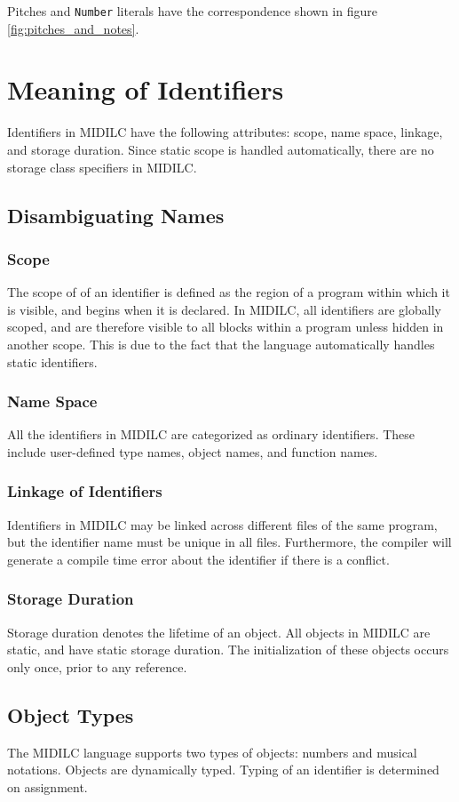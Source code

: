 \documentclass[12pt,A4]{book}
\begin{document}
Pitches and \verb|Number| literals have the correspondence shown in figure \ref{fig:pitches_and_notes}.

\section{Meaning of Identifiers}
Identifiers in MIDILC have the following attributes: scope, name space, linkage, and storage duration. Since static scope is handled automatically, there are no storage class specifiers in MIDILC.
\subsection{Disambiguating Names}
\subsubsection{Scope}
The scope of of an identifier is defined as the region of a program within which it is visible, and begins when it is declared. In MIDILC, all identifiers are globally scoped, and are therefore visible to all blocks within a program unless hidden in another scope. This is due to the fact that the language automatically handles static identifiers.
\subsubsection{Name Space}
All the identifiers in MIDILC are categorized as ordinary identifiers. These include user-defined type names, object names, and function names.
\subsubsection{Linkage of Identifiers}
Identifiers in MIDILC may be linked across different files of the same program, but the identifier name must be unique in all files. Furthermore, the compiler will generate a compile time error about the identifier if there is a conflict.
\subsubsection{Storage Duration}
Storage duration denotes the lifetime of an object. All objects in MIDILC are static, and have static storage duration. The initialization of these objects occurs only once, prior to any reference.
\subsection{Object Types}
The MIDILC language supports two types of objects: numbers and musical notations.  Objects are dynamically typed.  Typing of an identifier is determined on assignment.
\end{document}
